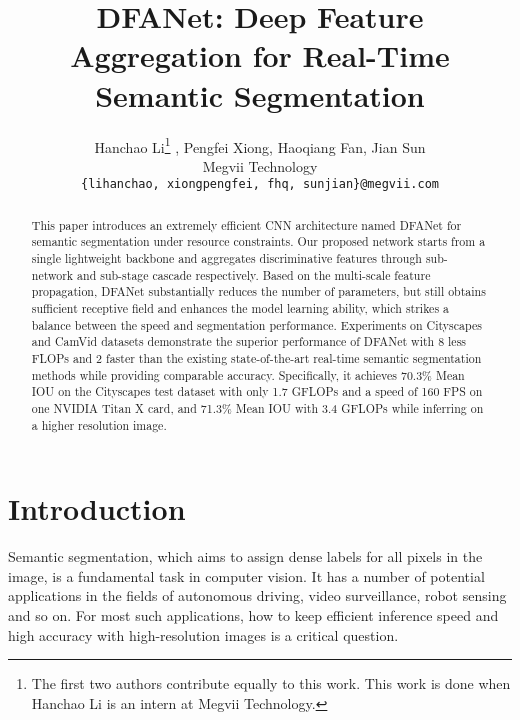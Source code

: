 \documentclass[10pt,twocolumn,letterpaper]{article}
\begin{document}
\title{DFANet: Deep Feature Aggregation for Real-Time Semantic Segmentation}

\author{Hanchao Li\thanks  {The first two authors contribute equally to this work. This work is done when Hanchao Li is an intern at Megvii Technology.} , Pengfei Xiong\footnotemark[1] , Haoqiang Fan, Jian Sun\\
Megvii Technology\\
{\tt\small \{lihanchao, xiongpengfei, fhq, sunjian\}@megvii.com}
}



\maketitle


\begin{abstract}
   This paper introduces an extremely efficient CNN architecture named DFANet for semantic segmentation under resource constraints. Our proposed network starts from a single lightweight backbone and aggregates discriminative features through sub-network and sub-stage cascade respectively. Based on the multi-scale feature propagation, DFANet substantially reduces the number of parameters, but still obtains sufficient receptive field and enhances the model learning ability, which strikes a balance between the speed and segmentation performance. Experiments on Cityscapes and CamVid datasets demonstrate the superior performance of DFANet with 8 less FLOPs and 2 faster than the existing state-of-the-art real-time semantic segmentation methods while providing comparable accuracy. Specifically, it achieves 70.3\% Mean IOU on the Cityscapes test dataset with only 1.7 GFLOPs and a speed of 160 FPS on one NVIDIA Titan X card, and 71.3\% Mean IOU with 3.4 GFLOPs while inferring on a higher resolution image.
\end{abstract}



\section{Introduction}
Semantic segmentation, which aims to assign dense labels for all pixels in the image, is a fundamental task in computer vision. It has a number of potential applications in the fields of autonomous driving, video surveillance, robot sensing and so on. For most such applications, how to keep efficient inference speed and high accuracy with high-resolution images is a critical question.
\end{document}
